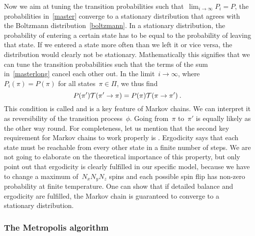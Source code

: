 Now we aim at tuning the transition probabilities such that~$\lim_{i \to \infty}
P_i = P$, \ie{} the probabilities in~\eqref{master} converge to a stationary
distribution that agrees with the Boltzmann distribution~\eqref{boltzmann}. In a
stationary distribution, the probability of entering a certain state has to be
equal to the probability of leaving that state. If we entered a state more often
than we left it or vice versa, the distribution would clearly not be stationary.
Mathematically this signifies that we can tune the transition probabilities such
that the terms of the sum in~\eqref{masterlong} cancel each other out. In the
limit~$i \to \infty$, where~$P_i(\pi) = P(\pi)$ for all states~$\pi \in \Pi$, we
thus find
%
\begin{equation}\label{detbal}
  P(\pi') \mathcal{T}(\pi' \to \pi) = P(\pi) \mathcal{T}(\pi \to \pi')\:.
\end{equation}
%
This condition is called  and is a key feature of
Markov chains. We can interpret it as reversibility of the transition
process~$\phi$. Going from~$\pi$ to~$\pi'$ is equally likely as the other way
round. For completeness, let us mention that the second key requirement for
Markov chains to work properly is . Ergodicity says that
each state must be reachable from every other state in a finite number of steps.
We are not going to elaborate on the theoretical importance of this property,
but only point out that ergodicity is clearly fulfilled in our specific model,
because we have to change a maximum of~$N_x N_y N_z$ spins and each possible
spin flip has non-zero probability at finite temperature. One can show that if
detailed balance and ergodicity are fulfilled, the Markov chain is guaranteed to
converge to a stationary distribution.

\subsubsection{The Metropolis algorithm}

